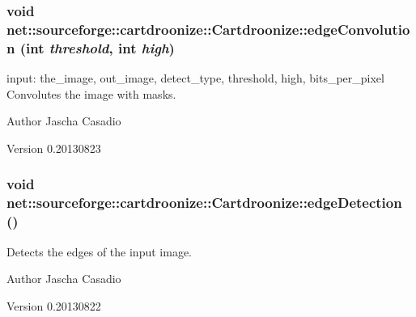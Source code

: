 \hypertarget{classnet_1_1sourceforge_1_1cartdroonize_1_1Cartdroonize_ae477df2b914a566630a950ded06a6d0e}{
\subsubsection[{edgeConvolution}]{\setlength{\rightskip}{0pt plus 5cm}void net::sourceforge::cartdroonize::Cartdroonize::edgeConvolution (int {\em threshold}, \/  int {\em high})}}
\label{classnet_1_1sourceforge_1_1cartdroonize_1_1Cartdroonize_ae477df2b914a566630a950ded06a6d0e}


input: the\_\-image, out\_\-image, detect\_\-type, threshold, high, bits\_\-per\_\-pixel Convolutes the image with masks. \begin{DoxyAuthor}{Author}
Jascha Casadio 
\end{DoxyAuthor}
\begin{DoxyVersion}{Version}
0.20130823
\end{DoxyVersion}


\hypertarget{classnet_1_1sourceforge_1_1cartdroonize_1_1Cartdroonize_adf8fd343e0e858e5edc35dd18f0d1e98}{
\subsubsection[{edgeDetection}]{\setlength{\rightskip}{0pt plus 5cm}void net::sourceforge::cartdroonize::Cartdroonize::edgeDetection ()}}
\label{classnet_1_1sourceforge_1_1cartdroonize_1_1Cartdroonize_adf8fd343e0e858e5edc35dd18f0d1e98}


Detects the edges of the input image. \begin{DoxyAuthor}{Author}
Jascha Casadio 
\end{DoxyAuthor}
\begin{DoxyVersion}{Version}
0.20130822
\end{DoxyVersion}


